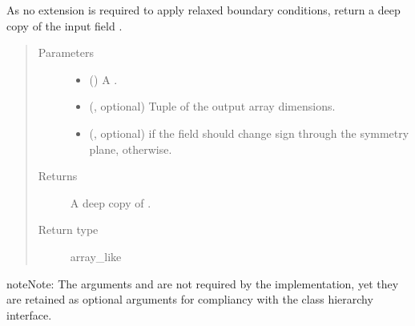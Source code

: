 \documentclass[letterpaper,10pt,english]{sphinxmanual}
\begin{document}
\begin{fulllineitems}
\begin{fulllineitems}
\label{\detokenize{api:dycore.horizontal_boundary.Relaxed.from_computational_to_physical_domain}}
As no extension is required to apply relaxed boundary conditions, return a deep copy of the
input field .
\begin{quote}\begin{description}
\item[{Parameters}] \leavevmode\begin{itemize}
\item {} 
 () \textendash{} A .

\item {} 
 (, optional) \textendash{} Tuple of the output array dimensions.

\item {} 
 (, optional) \textendash{}  if the field should change sign through the symmetry plane,  otherwise.

\end{itemize}

\item[{Returns}] \leavevmode
A deep copy of .

\item[{Return type}] \leavevmode
array\_like

\end{description}\end{quote}

\begin{sphinxadmonition}{note}{Note:}
The arguments  and  are not required by the implementation,
yet they are retained as optional arguments for compliancy with the class hierarchy interface.
\end{sphinxadmonition}

\end{fulllineitems}



\end{fulllineitems}
\end{document}
